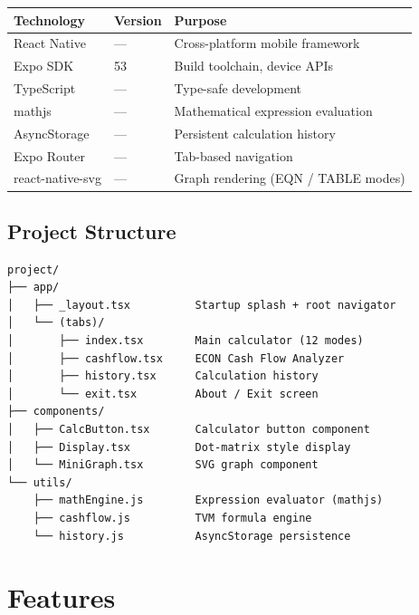 \documentclass[12pt]{article}
\begin{document}
\begin{center}
\begin{tabular}{lll}
\toprule
\textbf{Technology} & \textbf{Version} & \textbf{Purpose} \\
\midrule
React Native     & ---  & Cross-platform mobile framework \\
Expo SDK         & 53   & Build toolchain, device APIs \\
TypeScript       & ---  & Type-safe development \\
mathjs           & ---  & Mathematical expression evaluation \\
AsyncStorage     & ---  & Persistent calculation history \\
Expo Router      & ---  & Tab-based navigation \\
react-native-svg & ---  & Graph rendering (EQN / TABLE modes) \\
\bottomrule
\end{tabular}
\end{center}

\subsection{Project Structure}
\begin{verbatim}
project/
├── app/
│   ├── _layout.tsx          Startup splash + root navigator
│   └── (tabs)/
│       ├── index.tsx        Main calculator (12 modes)
│       ├── cashflow.tsx     ECON Cash Flow Analyzer
│       ├── history.tsx      Calculation history
│       └── exit.tsx         About / Exit screen
├── components/
│   ├── CalcButton.tsx       Calculator button component
│   ├── Display.tsx          Dot-matrix style display
│   └── MiniGraph.tsx        SVG graph component
└── utils/
    ├── mathEngine.js        Expression evaluator (mathjs)
    ├── cashflow.js          TVM formula engine
    └── history.js           AsyncStorage persistence
\end{verbatim}

\section{Features}
\end{document}
